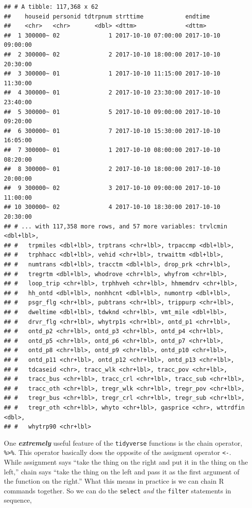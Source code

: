 \documentclass[]{book}
\begin{document}
\begin{verbatim}
## # A tibble: 117,368 x 62
##    houseid personid tdtrpnum strttime            endtime            
##    <chr>   <chr>       <dbl> <dttm>              <dttm>             
##  1 300000~ 02              1 2017-10-10 07:00:00 2017-10-10 09:00:00
##  2 300000~ 02              2 2017-10-10 18:00:00 2017-10-10 20:30:00
##  3 300000~ 01              1 2017-10-10 11:15:00 2017-10-10 11:30:00
##  4 300000~ 01              2 2017-10-10 23:30:00 2017-10-10 23:40:00
##  5 300000~ 01              5 2017-10-10 09:00:00 2017-10-10 09:20:00
##  6 300000~ 01              7 2017-10-10 15:30:00 2017-10-10 16:05:00
##  7 300000~ 01              1 2017-10-10 08:00:00 2017-10-10 08:20:00
##  8 300000~ 01              2 2017-10-10 18:00:00 2017-10-10 20:00:00
##  9 300000~ 02              3 2017-10-10 09:00:00 2017-10-10 11:00:00
## 10 300000~ 02              4 2017-10-10 18:30:00 2017-10-10 20:30:00
## # ... with 117,358 more rows, and 57 more variables: trvlcmin <dbl+lbl>,
## #   trpmiles <dbl+lbl>, trptrans <chr+lbl>, trpaccmp <dbl+lbl>,
## #   trphhacc <dbl+lbl>, vehid <chr+lbl>, trwaittm <dbl+lbl>,
## #   numtrans <dbl+lbl>, tracctm <dbl+lbl>, drop_prk <chr+lbl>,
## #   tregrtm <dbl+lbl>, whodrove <chr+lbl>, whyfrom <chr+lbl>,
## #   loop_trip <chr+lbl>, trphhveh <chr+lbl>, hhmemdrv <chr+lbl>,
## #   hh_ontd <dbl+lbl>, nonhhcnt <dbl+lbl>, numontrp <dbl+lbl>,
## #   psgr_flg <chr+lbl>, pubtrans <chr+lbl>, trippurp <chr+lbl>,
## #   dweltime <dbl+lbl>, tdwknd <chr+lbl>, vmt_mile <dbl+lbl>,
## #   drvr_flg <chr+lbl>, whytrp1s <chr+lbl>, ontd_p1 <chr+lbl>,
## #   ontd_p2 <chr+lbl>, ontd_p3 <chr+lbl>, ontd_p4 <chr+lbl>,
## #   ontd_p5 <chr+lbl>, ontd_p6 <chr+lbl>, ontd_p7 <chr+lbl>,
## #   ontd_p8 <chr+lbl>, ontd_p9 <chr+lbl>, ontd_p10 <chr+lbl>,
## #   ontd_p11 <chr+lbl>, ontd_p12 <chr+lbl>, ontd_p13 <chr+lbl>,
## #   tdcaseid <chr>, tracc_wlk <chr+lbl>, tracc_pov <chr+lbl>,
## #   tracc_bus <chr+lbl>, tracc_crl <chr+lbl>, tracc_sub <chr+lbl>,
## #   tracc_oth <chr+lbl>, tregr_wlk <chr+lbl>, tregr_pov <chr+lbl>,
## #   tregr_bus <chr+lbl>, tregr_crl <chr+lbl>, tregr_sub <chr+lbl>,
## #   tregr_oth <chr+lbl>, whyto <chr+lbl>, gasprice <chr>, wttrdfin <dbl>,
## #   whytrp90 <chr+lbl>
\end{verbatim}

One \textbf{\emph{extremely}} useful feature of the \texttt{tidyverse} functions is the chain
operator, \texttt{\%\textgreater{}\%}. This operator basically does the opposite of the assigment
operator \texttt{\textless{}-}. While assignment says ``take the thing on the right and put it in
the thing on the left,'' chain says ``take the thing on the left and pass it as
the first argument of the function on the right.'' What this means in practice is
we can chain R commands together. So we can do the \texttt{select} \emph{and} the \texttt{filter}
statements in sequence,
\end{document}
